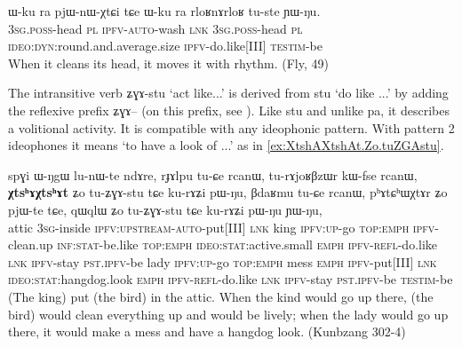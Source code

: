 \documentclass[oldfontcommands,oneside,a4paper,11pt]{article}
\newcommand{\ipa}[1]{{\phon \mbox{#1}}} %
\begin{document}
\begin{exe}
\ex \label{ex:rloR.nA.rloR}
\gll
\ipa{ɯ-ku} 	\ipa{ra} 	\ipa{pjɯ-nɯ-χtɕi} 	\ipa{tɕe} 	\ipa{ɯ-ku} 	\ipa{ra} 	\ipa{rloʁnɤrloʁ} 	\ipa{tu-ste} 	\ipa{ɲɯ-ŋu.} \\
\textsc{3sg.poss}-head \textsc{pl} \textsc{ipfv-auto}-wash \textsc{lnk} \textsc{3sg.poss}-head \textsc{pl}  \textsc{ideo:dyn}:round.and.average.size \textsc{ipfv}-do.like[III] \textsc{testim}-be \\ 
\glt When it cleans its head, it moves it with rhythm. (Fly, 49)
\end{exe}

The intransitive verb  \ipa{ʑɣɤ-stu} `act like...' is derived from \ipa{stu} `do like ...' by adding the reflexive prefix \ipa{ʑɣɤ--} (on this prefix, see \citealt{jacques10refl}). Like \ipa{stu} and unlike \ipa{pa}, it describes a volitional activity. It is compatible with any ideophonic pattern. With pattern 2 ideophones it means `to have a look of ...' as in \ref{ex:XtshAXtshAt.Zo.tuZGAstu}.

\begin{exe}
\ex \label{ex:XtshAXtshAt.Zo.tuZGAstu}
\gll
\ipa{spɣi} 	\ipa{ɯ-ŋgɯ} 	\ipa{lu-nɯ-te} 	\ipa{ndɤre,} 	 	\ipa{rɟɤlpu} 	\ipa{tu-ɕe} 	\ipa{rcanɯ,} 	\ipa{tu-rɤjoʁβzɯr} 	\ipa{kɯ-fse} 	\ipa{rcanɯ,} 	\ipa{\textbf{χtsʰɤχtsʰɤt}} 	\ipa{ʑo} 	\ipa{tu-ʑɣɤ-stu} 	\ipa{tɕe} 	\ipa{ku-rɤʑi} 	\ipa{pɯ-ŋu,} 	\ipa{βdaʁmu} 	\ipa{tu-ɕe} 	\ipa{rcanɯ,} 	\ipa{pʰɤtɕʰɯχtɤr} 	\ipa{ʑo} 	\ipa{pjɯ-te} 	\ipa{tɕe,} 	\ipa{qɯqlɯ} 	\ipa{ʑo} 	\ipa{tu-ʑɣɤ-stu} 	\ipa{tɕe} 	\ipa{ku-rɤʑi} 	\ipa{pɯ-ŋu} 	\ipa{ɲɯ-ŋu,} 	\\
attic \textsc{3sg}-inside \textsc{ipfv:upstream-auto}-put[III] \textsc{lnk} king  \textsc{ipfv:up}-go \textsc{top:emph} \textsc{ipfv}-clean.up \textsc{inf:stat}-be.like  \textsc{top:emph} \textsc{ideo:stat}:active.small \textsc{emph} \textsc{ipfv-refl}-do.like \textsc{lnk} \textsc{ipfv}-stay \textsc{pst.ipfv}-be  lady  \textsc{ipfv:up}-go \textsc{top:emph} mess \textsc{emph} \textsc{ipfv}-put[III] \textsc{lnk} \textsc{ideo:stat}:hangdog.look \textsc{emph} \textsc{ipfv-refl}-do.like \textsc{lnk} \textsc{ipfv}-stay \textsc{pst.ipfv}-be \textsc{testim}-be \\
\glt (The king) put (the bird) in the attic. When the kind would go up there, (the bird) would clean everything up and would be lively; when the lady would go up there, it would make a mess and have a hangdog look. (Kunbzang 302-4)
\end{exe}
\end{document}
